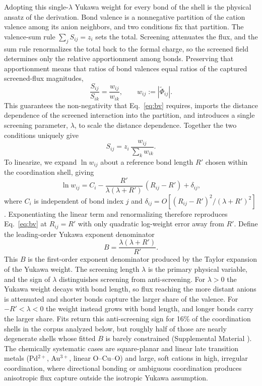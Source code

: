 \documentclass[aps,prmaterials,twocolumn,10pt,superscriptaddress,floatfix]{revtex4-2}
\begin{document}
Adopting this single-$\lambda$ Yukawa weight for every bond of the
shell is the physical ansatz of the derivation.
Bond valence is a nonnegative partition of the cation valence among its
anion neighbors, and two conditions fix that partition.  The
valence-sum rule $\sum_j S_{ij}=z_i$ sets the total.
Screening attenuates the flux, and the sum rule renormalizes
the total back to the formal charge, so the screened field determines only the
relative apportionment among bonds.  Preserving that
apportionment means that ratios of bond valences equal ratios of the
captured screened-flux magnitudes,
\begin{equation*}
\frac{S_{ij}}{S_{ik}}=\frac{w_{ij}}{w_{ik}},
\qquad w_{ij}:=|\widetilde\Phi_{ij}|.
\end{equation*}
This guarantees the non-negativity that Eq.~\eqref{eq:bv} requires,
imports the distance dependence of the screened interaction into the
partition, and introduces a single screening parameter, $\lambda$, to
scale the distance dependence.  Together the two conditions uniquely give
\begin{equation}\label{eq:partition}
S_{ij}=z_i\,\frac{w_{ij}}{\sum_k w_{ik}}.
\end{equation}
To linearize, we expand $\ln w_{ij}$ about a reference bond length $R'$
chosen within the coordination shell, giving
\begin{equation}\label{eq:expansion}
\ln w_{ij}= C_i - \frac{R'}{\lambda(\lambda+R')}\,(R_{ij}-R')+\delta_{ij},
\end{equation}
where $C_i$ is independent of bond index $j$ and
$\delta_{ij}=O[(R_{ij}-R')^2/(\lambda+R')^2]$.
Exponentiating the linear
term and renormalizing therefore reproduces Eq.~\eqref{eq:bv} at
$R_{ij}=R'$ with only quadratic log-weight error away from $R'$.  Define
the leading-order Yukawa exponent denominator
\begin{equation}\label{eq:B_composite}
B = \frac{\lambda(\lambda+R')}{R'}.
\end{equation}
This $B$ is the first-order exponent denominator produced by the Taylor
expansion of the Yukawa weight. The screening length $\lambda$ is the
primary physical variable, and the sign of $\lambda$ distinguishes
screening from anti-screening.  For $\lambda>0$ the Yukawa weight
decays with bond length, so flux reaching the more distant anions is
attenuated and shorter bonds capture the larger share of the valence.
For $-R'<\lambda<0$ the weight instead grows with bond length, and
longer bonds carry the larger share.  Fits return this anti-screening
sign for 16\% of the coordination shells in the corpus analyzed below,
but roughly half of those are nearly degenerate shells whose fitted
$B$ is barely constrained (Supplemental Material \cite{suppmat}).  The
chemically systematic cases are square-planar and linear late
transition metals (Pd$^{2+}$, Au$^{3+}$, linear O--Cu--O) and large,
soft cations in high, irregular coordination, where directional
bonding or ambiguous coordination produces anisotropic flux capture
outside the isotropic Yukawa assumption.
\end{document}
